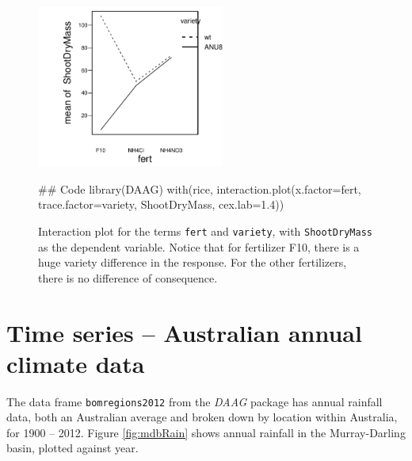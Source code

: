 \documentclass{tufte-book}\usepackage[]{graphicx}\usepackage[]{color}
\newcommand{\txtt}[1]{\texttt{#1}}
\begin{document}
\begin{figure}
\begin{Schunk}


\centerline{\includegraphics[width=0.55\textwidth]{figs/05-do-interact-1} }

\end{Schunk}
    \caption{Interaction plot for the terms \txtt{fert} and
      \txtt{variety}, with \txtt{ShootDryMass} as the dependent
      variable. Notice that for fertilizer F10, there is a huge
      variety difference in the response. For the other fertilizers,
      there is no difference of consequence.\label{fig:rice-interact}}
\begin{Schunk}
\begin{Sinput}
## Code
library(DAAG)
with(rice, interaction.plot(x.factor=fert,
                            trace.factor=variety,
                            ShootDryMass,
                            cex.lab=1.4))
\end{Sinput}
\end{Schunk}
\end{figure}

\section{Time series -- Australian annual climate data}

The data frame \txtt{bomregions2012} from the {\em DAAG} package has
annual rainfall data, both an Australian average and broken down by
location within Australia, for 1900 -- 2012.
Figure \ref{fig:mdbRain} shows annual rainfall in the Murray-Darling
basin, plotted against year.
\end{document}
